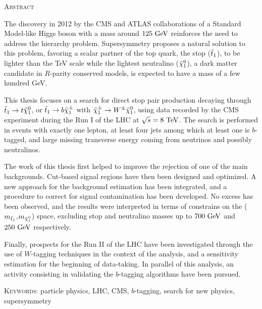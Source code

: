 \vspace*{-0.2cm}
\begin{framed}
    \vspace*{-0.7cm}
\begin{center}\textsc{Abstract}\end{center}
    \vspace*{-0.4cm}
    The discovery in 2012 by the CMS and ATLAS collaborations of a Standard
    Model-like Higgs boson with a mass around $125~\text{GeV}$ reinforces the need to
    address the hierarchy problem. Supersymmetry proposes a natural solution to
    this problem, favoring a scalar partner of the top quark, the stop
    ($\tilde{t}_1$), to be lighter than the TeV scale while the lightest neutralino
    ($\tilde{\chi}_1^0$), a dark matter candidate in $R$-parity conserved models, is
    expected to have a mass of a few hundred GeV.

    This thesis focuses on a search for direct stop pair production decaying
    through $\tilde{t}_1 \rightarrow t \tilde{\chi}_1^0$, or $\tilde{t}_1 \rightarrow b
    \tilde{\chi}_1^\pm$ with $\tilde{\chi}_1^\pm \rightarrow W^\pm \tilde{\chi}_1^0$, using data
    recorded by the CMS experiment during the Run I of the LHC at $\sqrt{s} =
    8~\text{TeV}$. The search is performed in events with exactly one lepton, at least
    four jets among which at least one is $b$-tagged, and large missing
    transverse energy coming from neutrinos and possibly neutralinos.

    The work of this thesis first helped to improve the rejection of one of the
    main backgrounds.  Cut-based signal regions have then been designed and
    optimized. A new approach for the background estimation has been integrated,
    and a procedure to correct for signal contamination has been developed. No
    excess has been observed, and the results were interpreted in terms of
    constrains on the ($m_{\tilde{t}_1}$,$m_{\tilde{\chi}_1^0}$) space, excluding
    stop and neutralino masses up to $700~\text{GeV}$ and $250~\text{GeV}$ respectively.

    Finally, prospects for the Run II of the LHC have been investigated through
    the use of $W$-tagging techniques in the context of the analysis, and a
    sensitivity estimation for the beginning of data-taking. In parallel of this
    analysis, an activity consisting in validating the $b$-tagging algorithms
    have been pursued.

    \textsc{Keywords}: particle physics, LHC, CMS, $b$-tagging, search for new
    physics, supersymmetry
\end{framed}
